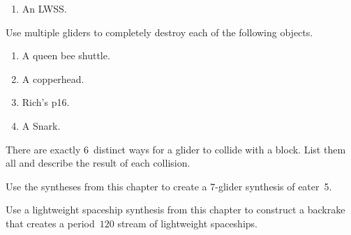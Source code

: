 \begin{multicols}{2}
\begin{problemstar}
\begin{enumerate}[label=\bf\color{ocre}(\alph*)]
			\item An LWSS.
		\end{enumerate}
	\end{problemstar}
	
	
	\mfilbreak
	
	
	\begin{problem}\label{exer:multiple_glider_cleanup} 
		Use multiple gliders to completely destroy each of the following objects.
		
		\begin{enumerate}[label=\bf\color{ocre}(\alph*)]
			\item A queen bee shuttle.
			
			\item A copperhead.
			
			\item Rich's p16.
			
			\item A Snark.
		\end{enumerate}
	\end{problem}
	
	
	\mfilbreak
	
	
	\begin{problemstar}\label{exer:glider_block_collisions} 
		There are exactly $6$~distinct ways for a glider to collide with a block. List them all and describe the result of each collision.
	\end{problemstar}
	
	
	\mfilbreak
	
	
	\begin{problemstar}\label{exer:twit_synthesis} 
		Use the syntheses from this chapter to create a 7-glider synthesis of eater~5.
	\end{problemstar}
	
	
	\mfilbreak
	
	
	\begin{problem}\label{exer:p60_lwss_backrake} 
		Use a lightweight spaceship synthesis from this chapter to construct a backrake that creates a period~$120$ stream of lightweight spaceships.
	\end{problem}
	

\end{multicols}
